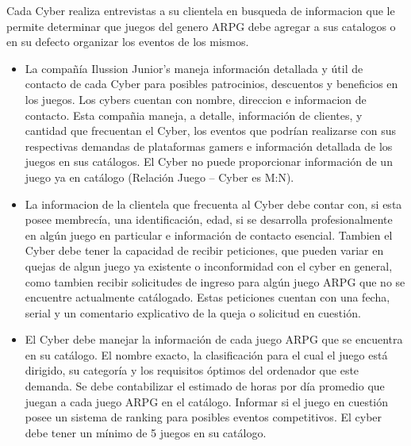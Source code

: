 \documentclass[a4paper,12pt]{article}
\begin{document}
Cada Cyber realiza entrevistas a su clientela en busqueda de informacion que le permite determinar que juegos del genero ARPG debe agregar a sus catalogos o en su defecto organizar los eventos de los mismos.\\

\begin{itemize}

\item La compañía Ilussion Junior's maneja información detallada y útil de contacto de cada Cyber para posibles patrocinios, descuentos y beneficios en los juegos. Los cybers cuentan con nombre, direccion e informacion de contacto. Esta compañia maneja, a detalle, información de clientes, y cantidad que frecuentan el Cyber, los eventos que podrían realizarse con sus respectivas demandas de plataformas gamers e información detallada de los juegos en sus catálogos. El Cyber no puede proporcionar información de un juego ya en catálogo (Relación Juego -- Cyber es M:N).

\item La informacion de la clientela que frecuenta al Cyber debe contar con, si esta posee membrecía, una identificación, edad, si se desarrolla profesionalmente en algún juego en particular e información de contacto esencial. Tambien el Cyber debe tener la capacidad de recibir peticiones, que pueden variar en quejas de algun juego ya existente o inconformidad con el cyber en general, como tambien recibir solicitudes de ingreso para algún juego ARPG que no se encuentre actualmente catálogado. Estas peticiones cuentan con una fecha, serial y un comentario explicativo de la queja o solicitud en cuestión.

\item El Cyber debe manejar la información de cada juego ARPG que se encuentra en su catálogo. El nombre exacto, la clasificación para el cual el juego está dirigido, su categoría y los requisitos óptimos del ordenador que este demanda. Se debe contabilizar el estimado de horas por día promedio que juegan a cada juego ARPG en el catálogo. Informar si el juego en cuestión posee un sistema de ranking para posibles eventos competitivos. El cyber debe tener un mínimo de 5 juegos en su catálogo.


\end{itemize}
\end{document}
